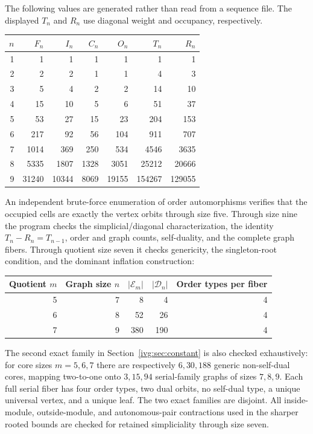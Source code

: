 \documentclass[11pt,letterpaper]{article}
\theoremstyle{definition}\newtheorem{definition}[theorem]{Definition}
\theoremstyle{remark}\newtheorem{remark}[theorem]{Remark}
\begin{document}
The following values are generated rather than read from a sequence file. The displayed $T_n$ and $R_n$ use diagonal weight and occupancy, respectively.
\begin{center}
\begin{tabular}{rrrrrrr}
\toprule
$n$&$F_n$&$I_n$&$C_n$&$O_n$&$T_n$&$R_n$\\
\midrule
1&1&1&1&1&1&1\\
2&2&2&1&1&4&3\\
3&5&4&2&2&14&10\\
4&15&10&5&6&51&37\\
5&53&27&15&23&204&153\\
6&217&92&56&104&911&707\\
7&1014&369&250&534&4546&3635\\
8&5335&1807&1328&3051&25212&20666\\
9&31240&10344&8069&19155&154267&129055\\
\bottomrule
\end{tabular}
\end{center}
An independent brute-force enumeration of order automorphisms verifies that the occupied cells are exactly the vertex orbits through size five. Through size nine the program checks the simplicial/diagonal characterization, the identity $T_n-R_n=T_{n-1}$, order and graph counts, self-duality, and the complete graph fibers. Through quotient size seven it checks genericity, the singleton-root condition, and the dominant inflation construction:
\begin{center}
\begin{tabular}{rrrrr}
\toprule
Quotient $m$&Graph size $n$&$|\mathcal E_m|$&$|\mathcal D_n|$&Order types per fiber\\
\midrule
5&7&8&4&4\\
6&8&52&26&4\\
7&9&380&190&4\\
\bottomrule
\end{tabular}
\end{center}
The second exact family in Section~\ref{ivg:sec:constant} is also checked exhaustively: for core sizes $m=5,6,7$ there are respectively $6,30,188$ generic non-self-dual cores, mapping two-to-one onto $3,15,94$ serial-family graphs of sizes $7,8,9$. Each full serial fiber has four order types, two dual orbits, no self-dual type, a unique universal vertex, and a unique leaf. The two exact families are disjoint. All inside-module, outside-module, and autonomous-pair contractions used in the sharper rooted bounds are checked for retained simpliciality through size seven.
\end{document}
